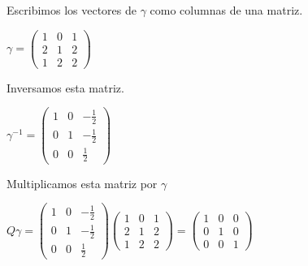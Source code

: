 \begin{enumerate}
    \vspace{2mm}

    \noindent \solucion

    \begin{center}
        Escribimos los vectores de $\gamma$ como columnas de una matriz.

        \vspace{5mm}

        $
        \gamma = 
        \begin{pmatrix}
            1 & 0 & 1 \\
            2 & 1 & 2 \\
            1 & 2 & 2
        \end{pmatrix}
        $        

        \vspace{5mm}

        Inversamos esta matriz.

        \vspace{5mm}

        $
        \gamma^{-1} = 
            \begin{pmatrix}
                1 & 0 & -\frac{1}{2} \\
                0 & 1 & -\frac{1}{2} \\
                0 & 0 & \frac{1}{2}
            \end{pmatrix}
        $

        \vspace{5mm}
        
        Multiplicamos esta matriz por $\gamma$

        \vspace{5mm}

        $
        Q \gamma = 
            \begin{pmatrix}
                1 & 0 & -\frac{1}{2} \\
                0 & 1 & -\frac{1}{2} \\
                0 & 0 & \frac{1}{2}
            \end{pmatrix}
            \begin{pmatrix}
                1 & 0 & 1 \\
                2 & 1 & 2 \\
                1 & 2 & 2
            \end{pmatrix} = 
            \begin{pmatrix}
                1 & 0 & 0 \\
                0 & 1 & 0 \\
                0 & 0 & 1
            \end{pmatrix}
        $


\end{center}
\end{enumerate}
